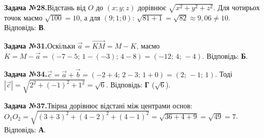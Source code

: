 \documentclass[12pt]{article}
\begin{document}
\par\vspace{0.3cm}\noindent\hypertarget{sol:28}{}
\begin{tcolorbox}[colback=titleBg!40, colframe=mainGreen!55, boxrule=0.4pt, arc=2pt, left=6pt, right=6pt, top=4pt, bottom=4pt, breakable]
\noindent\small\textbf{Задача №28.}\quad Відстань від $O$ до $(x;y;z)$ дорівнює $\sqrt{x^2+y^2+z^2}$. Для чотирьох точок маємо $\sqrt{100}=10$, а для $(9;1;0)$: $\sqrt{81+1}=\sqrt{82}\approx 9{,}06\neq 10$. Відповідь: \textbf{В}.
\par\vspace{0.1cm}\hfill\hyperlink{task:28}{}
\end{tcolorbox}
\par\vspace{0.3cm}\noindent\hypertarget{sol:31}{}
\begin{tcolorbox}[colback=titleBg!40, colframe=mainGreen!55, boxrule=0.4pt, arc=2pt, left=6pt, right=6pt, top=4pt, bottom=4pt, breakable]
\noindent\small\textbf{Задача №31.}\quad Оскільки $\vec{a}=\overrightarrow{KM}=M-K$, маємо $K=M-\vec{a}=(-7-5;\,1-(-3);\,4-8)=(-12;\,4;\,-4)$. Відповідь: \textbf{Б}.
\par\vspace{0.1cm}\hfill\hyperlink{task:31}{}
\end{tcolorbox}
\par\vspace{0.3cm}\noindent\hypertarget{sol:34}{}
\begin{tcolorbox}[colback=titleBg!40, colframe=mainGreen!55, boxrule=0.4pt, arc=2pt, left=6pt, right=6pt, top=4pt, bottom=4pt, breakable]
\noindent\small\textbf{Задача №34.}\quad $\vec{c} = \vec{a} + \vec{b} = (-2+4;\, 2-3;\, 1+0) = (2;\, -1;\, 1)$. Тоді $|\vec{c}| = \sqrt{2^2 + (-1)^2 + 1^2} = \sqrt{6}$. Відповідь: \textbf{Г} ($\sqrt6$).
\par\vspace{0.1cm}\hfill\hyperlink{task:34}{}
\end{tcolorbox}
\par\vspace{0.3cm}\noindent\hypertarget{sol:37}{}
\begin{tcolorbox}[colback=titleBg!40, colframe=mainGreen!55, boxrule=0.4pt, arc=2pt, left=6pt, right=6pt, top=4pt, bottom=4pt, breakable]
\noindent\small\textbf{Задача №37.}\quad Твірна дорівнює відстані між центрами основ: $O_1O_2=\sqrt{(3+3)^2+(4-2)^2+(4-1)^2}=\sqrt{36+4+9}=\sqrt{49}=7$. Відповідь: \textbf{А}.
\par\vspace{0.1cm}\hfill\hyperlink{task:37}{}
\end{tcolorbox}
\end{document}
